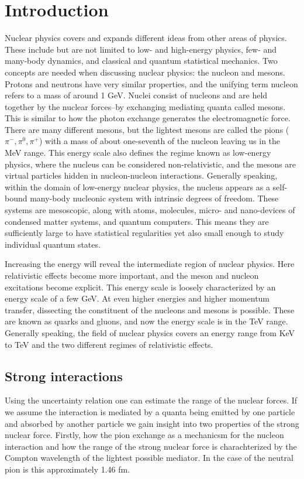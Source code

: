 \chapter{Introduction}
Nuclear physics covers and expands different ideas from other areas of physics. These include but are not limited to low- and high-energy physics, few- and many-body dynamics, and classical and quantum statistical mechanics. Two concepts are needed when discussing nuclear physics: the nucleon and mesons. Protons and neutrons have very similar properties, and the unifying term nucleon refers to a mass of around 1 GeV. Nuclei consist of nucleons and are held together by the nuclear forces--by exchanging mediating quanta called mesons. This is similar to how the photon exchange generates the electromagnetic force. There are many different mesons, but the lightest mesons are called the pions ($\pi^-,\pi^0,\pi^+$) with a mass of about one-seventh of the nucleon leaving us in the MeV range. This energy scale also defines the regime known as low-energy physics, where the nucleus can be considered non-relativistic, and the mesons are virtual particles hidden in nucleon-nucleon interactions.
Generally speaking, within the domain of low-energy nuclear physics, the nucleus appears as a self-bound many-body nucleonic system with intrinsic degrees of freedom. These systems are mesoscopic, along with atoms, molecules, micro- and nano-devices of condensed matter systems, and quantum computers. This means they are sufficiently large to have statistical regularities yet also small enough to study individual quantum states.

 Increasing the energy will reveal the intermediate region of nuclear physics. Here relativistic effects become more important, and the meson and nucleon excitations become explicit. This energy scale is loosely characterized by an energy scale of a few GeV. At even higher energies and higher momentum transfer, dissecting the constituent of the nucleons and mesons is possible. These are known as quarks and gluons, and now the energy scale is in the TeV range. Generally speaking, the field of nuclear physics covers an energy range from KeV to TeV and the two different regimes of relativistic effects. 
\section{Strong interactions}
Using the uncertainty relation one can estimate the range of the nuclear forces. If we assume the interaction is mediated by a quanta being emitted by one particle and absorbed by another particle we gain insight into two properties of the strong nuclear force. Firstly, how the pion exchange as a mechanicsm for the nucleon interaction and how the range of the strong nuclear force is charachterized by the Compton wavelength of the lightest possible mediator. In the case of the neutral pion is this approximately 1.46 fm. 
